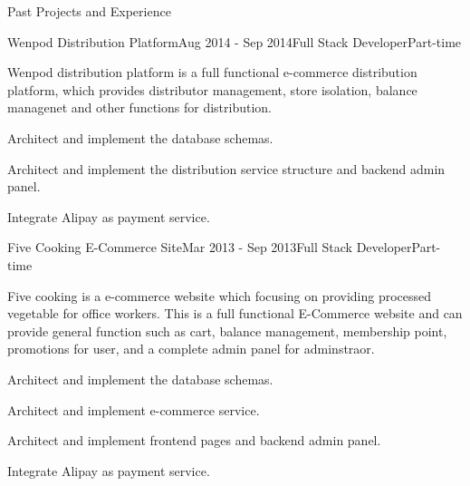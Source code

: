 \documentclass{resume} %
\begin{document}
\begin{rSection}{Past Projects and Experience}
\begin{rSubsection}{Wenpod Distribution Platform}{Aug 2014 - Sep 2014}{Full Stack Developer}{Part-time}

Wenpod distribution platform is a full functional e-commerce distribution platform, which provides distributor management, store isolation, balance managenet and other functions for distribution.

\begin{rSubsectionList}
\item Architect and implement the database schemas.
\item Architect and implement the distribution service structure and backend admin panel.
\item Integrate Alipay as payment service.
\end{rSubsectionList}
\end{rSubsection}



\begin{rSubsection}{Five Cooking E-Commerce Site}{Mar 2013 - Sep 2013}{Full Stack Developer}{Part-time}

Five cooking is a e-commerce website which focusing on providing processed vegetable for office workers. This is a full functional E-Commerce website and can provide general function such as cart, balance management, membership point, promotions for user, and a complete admin panel for adminstraor.

\begin{rSubsectionList}
\item Architect and implement the database schemas.
\item Architect and implement e-commerce service.
\item Architect and implement frontend pages and backend admin panel.
\item Integrate Alipay as payment service.
\end{rSubsectionList}
\end{rSubsection}



\end{rSection}
\end{document}
